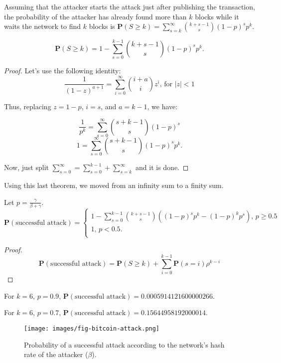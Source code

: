 Assuming that the attacker starts the attack just after publishing the transaction, the probability of the attacker has already found more than $k$ blocks while it waits the network to find $k$ blocks is $\mathbf{P}(S \geq k) = \sum_{s=k}^{\infty} \binom{k+s-1}{s} (1-p)^s p^k$.

\begin{theorem}
	$$\mathbf{P}(S \geq k) = 1 - \sum_{s=0}^{k-1} \binom{k+s-1}{s} (1-p)^s p^k.$$
\end{theorem}
\begin{proof}
	Let's use the following identity:
	$$\frac{1}{(1-z)^{a+1}} = \sum_{i=0}^{\infty} \binom{i+a}{i} z^i \text{, for $|z|<1$}$$

	Thus, replacing $z=1-p$, $i=s$, and $a=k-1$, we have:

	$$\frac{1}{p^{k}} = \sum_{s=0}^{\infty} \binom{s+k-1}{s} (1-p)^s$$
	$$1 = \sum_{s=0}^{\infty} \binom{s+k-1}{s} (1-p)^s p^k.$$

	Now, just split $\sum_{s=0}^{\infty} = \sum_{s=0}^{k-1} + \sum_{s=k}^{\infty}$ and it is done.
\end{proof}

Using this last theorem, we moved from an infinity sum to a finity sum.

\begin{theorem}
	Let $p = \frac{\gamma}{\beta + \gamma}$.
$$
\mathbf{P}(\text{successful attack}) =
\begin{cases}
	1 - \sum_{s=0}^{k-1} \binom{k+s-1}{s} \left( (1-p)^s p^k - (1-p)^k p^s \right) \text{, $p \geq 0.5$} \\
	1 \text{, $p < 0.5$}.\\
\end{cases}
$$
\end{theorem}
\begin{proof}
$$
\mathbf{P}(\text{successful attack}) = \mathbf{P}(S \geq k) + \sum_{i=0}^{k-1} \mathbf{P}(s=i) \rho^{k-i}
$$
\end{proof}


For $k=6$, $p=0.9$, $\mathbf{P}(\text{successful attack}) = 0.0005914121600000266$.

For $k=6$, $p=0.7$, $\mathbf{P}(\text{successful attack}) = 0.15644958192000014$.

\begin{figure}[ht]
\centering\texttt{[image: images/fig-bitcoin-attack.png]}
\caption{Probability of a successful attack according to the network's hash rate of the attacker ($\beta$).\label{fig-bitcoin-attack}}
\end{figure}

